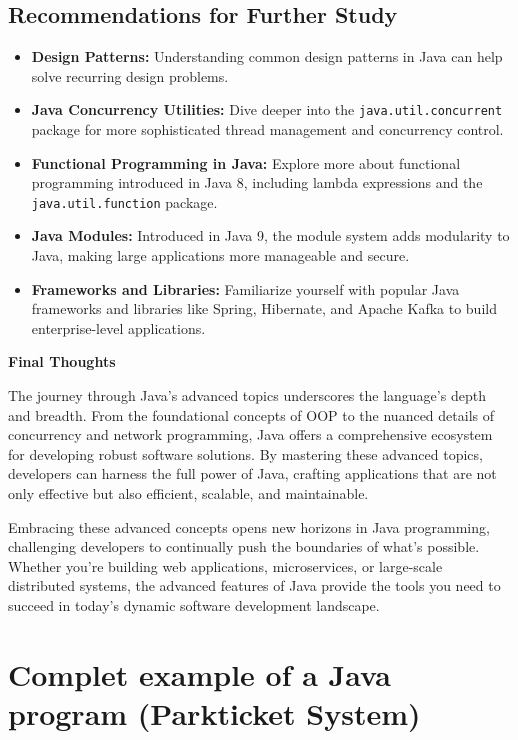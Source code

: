 \documentclass{article}
\begin{document}
\subsection{Recommendations for Further Study}
\begin{itemize}
    \item \textbf{Design Patterns:} Understanding common design patterns in Java can help solve recurring design problems.
    \item \textbf{Java Concurrency Utilities:} Dive deeper into the \texttt{java.util.concurrent} package for more sophisticated thread management and concurrency control.
    \item \textbf{Functional Programming in Java:} Explore more about functional programming introduced in Java 8, including lambda expressions and the \texttt{java.util.function} package.
    \item \textbf{Java Modules:} Introduced in Java 9, the module system adds modularity to Java, making large applications more manageable and secure.
    \item \textbf{Frameworks and Libraries:} Familiarize yourself with popular Java frameworks and libraries like Spring, Hibernate, and Apache Kafka to build enterprise-level applications.
\end{itemize}

\textbf{Final Thoughts}

The journey through Java's advanced topics underscores the language's depth and breadth. From the foundational concepts of OOP to the nuanced details of concurrency and network programming, Java offers a comprehensive ecosystem for developing robust software solutions. By mastering these advanced topics, developers can harness the full power of Java, crafting applications that are not only effective but also efficient, scalable, and maintainable.

Embracing these advanced concepts opens new horizons in Java programming, challenging developers to continually push the boundaries of what's possible. Whether you're building web applications, microservices, or large-scale distributed systems, the advanced features of Java provide the tools you need to succeed in today's dynamic software development landscape.



\newpage
\section{Complet example of a Java program (Parkticket System)}
\end{document}
